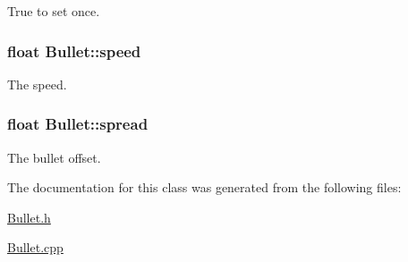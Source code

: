 True to set once. 

\hypertarget{class_bullet_a5fbd5204eec00c8285686abeb4547f16}{
\subsubsection[{speed}]{\setlength{\rightskip}{0pt plus 5cm}float Bullet\-::speed\hspace{0.3cm}{\ttfamily [private]}}}\label{class_bullet_a5fbd5204eec00c8285686abeb4547f16}


The speed. 

\hypertarget{class_bullet_ab941816334c79d597fe0d20225da563b}{
\subsubsection[{spread}]{\setlength{\rightskip}{0pt plus 5cm}float Bullet\-::spread\hspace{0.3cm}{\ttfamily [private]}}}\label{class_bullet_ab941816334c79d597fe0d20225da563b}


The bullet offset. 



The documentation for this class was generated from the following files\-:\begin{DoxyCompactItemize}
\item 
\hyperlink{_bullet_8h}{Bullet.\-h}\item 
\hyperlink{_bullet_8cpp}{Bullet.\-cpp}\end{DoxyCompactItemize}
